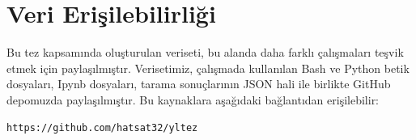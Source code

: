 \chapter{Veri Erişilebilirliği}\label{sec:data-availability}
\vspace{12pt}

Bu tez kapsamında oluşturulan veriseti, bu alanda daha farklı çalışmaları teşvik etmek için paylaşılmıştır. Verisetimiz, çalışmada kullanılan Bash ve Python betik dosyaları, Ipynb dosyaları, tarama sonuçlarının JSON hali ile birlikte GitHub depomuzda paylaşılmıştır. Bu kaynaklara aşağıdaki bağlantıdan erişilebilir:

\begin{lstlisting}
https://github.com/hatsat32/yltez
\end{lstlisting}
